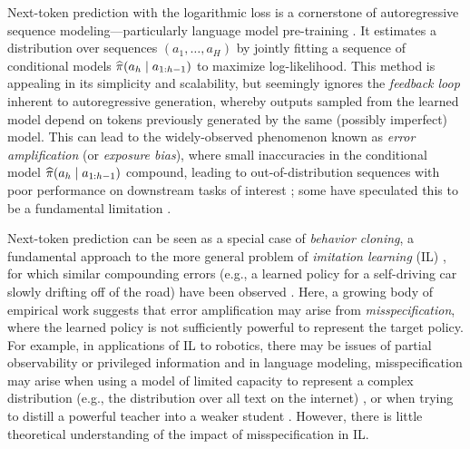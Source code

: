 

Next-token prediction with the logarithmic loss \citep{shannon1951prediction} is a cornerstone of autoregressive sequence modeling---particularly language
model pre-training \citep{vaswani2017attention,radford2019language}. It estimates a distribution over sequences $(a_1,\ldots,a_H)$ by jointly fitting a sequence
  of conditional models
  $\widehat{\pi}(a_h\mid{}a_{1:h-1})$ to
  maximize log-likelihood.
  This method is appealing in its simplicity and scalability, but seemingly ignores the \emph{feedback loop}
  inherent to autoregressive generation, whereby outputs sampled from
  the learned model depend on tokens previously generated by
    the same (possibly imperfect) model. This can
  lead to the widely-observed phenomenon known as \emph{error
    amplification} (or \emph{exposure
  bias}), where small inaccuracies in the conditional model
$\widehat{\pi}(a_h\mid{}a_{1:h-1})$ compound, leading to out-of-distribution
sequences with poor performance on downstream tasks of interest
\citep{holtzman2019curious,braverman2020calibration,arora2022exposure,block2023butterfly};
some have speculated this to be a fundamental limitation \citep{lecun2023large,bachmann2024pitfalls}.

Next-token prediction can be seen as a special case of
    \emph{behavior cloning}, a fundamental approach to the more general
    problem of \emph{imitation learning} (IL) \citep{pomerleau1988alvinn}, for which similar compounding errors
    (e.g., a learned policy
    for a self-driving car
    slowly drifting off of the road) have been observed    \citep{ross2010efficient,laskey2017dart,block2023butterfly}. Here,
    a growing body of empirical work
\citep{bansal2018chauffeurnet,de2019causal,spencer2021feedback}
    suggests that error amplification may
    arise from \emph{misspecification}, where the learned policy is not
    sufficiently powerful to represent the target policy. For example, in applications of IL to robotics, there may be issues of partial
    observability or privileged information \citep{de2019causal} and in language modeling,
    misspecification may arise when using a
    model of limited capacity to represent a
    complex distribution (e.g., the distribution over all
    text on the internet) \citep{braverman2020calibration}, or when trying to distill a powerful
    teacher into a weaker student \citep{touvron2023llama,team2024gemini}. However, there is little theoretical understanding of the impact of misspecification in IL.\loose




